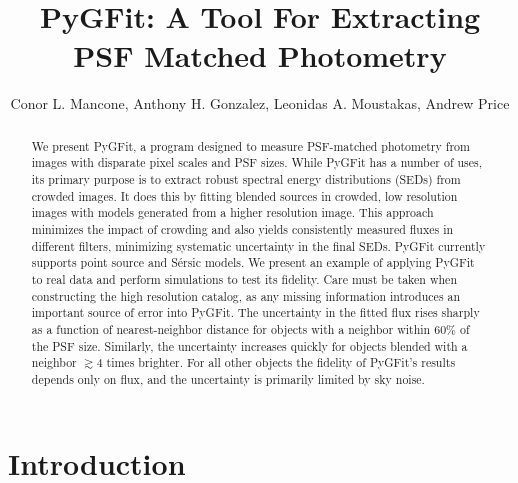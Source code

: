\documentclass[preprint]{aastex}
\makeatletter
\newcommand{\myemail}{cmancone@astro.ufl.edu}
\newcommand{\sersic}{S\'{e}rsic}
\newcommand{\pygfit}{PyGFit}
\makeatother
\begin{document}

\title{PyGFit: A Tool For Extracting PSF Matched Photometry}

\author{Conor L. Mancone,
Anthony H. Gonzalez,
Leonidas A. Moustakas,
Andrew Price
}

\email{\myemail}

\begin{abstract}
We present \pygfit{}, a program designed to measure PSF-matched photometry from images with disparate pixel scales and PSF sizes.  While \pygfit{} has a number of uses, its primary purpose is to extract robust spectral energy distributions (SEDs) from crowded images.  It does this by fitting blended sources in crowded, low resolution images with models generated from a higher resolution image.  This approach minimizes the impact of crowding and also yields consistently measured fluxes in different filters, minimizing systematic uncertainty in the final SEDs.  \pygfit{} currently supports point source and \sersic{} models.  We present an example of applying \pygfit{} to real data and perform simulations to test its fidelity.  Care must be taken when constructing the high resolution catalog, as any missing information introduces an important source of error into \pygfit{}.  The uncertainty in the fitted flux rises sharply as a function of nearest-neighbor distance for objects with a neighbor within $60\%$ of the PSF size.  Similarly, the uncertainty increases quickly for objects blended with a neighbor $\gtrsim4$ times brighter.  For all other objects the fidelity of \pygfit{}'s results depends only on flux, and the uncertainty is primarily limited by sky noise.
\end{abstract}


\section{Introduction}\label{sec:intro}
\end{document}
